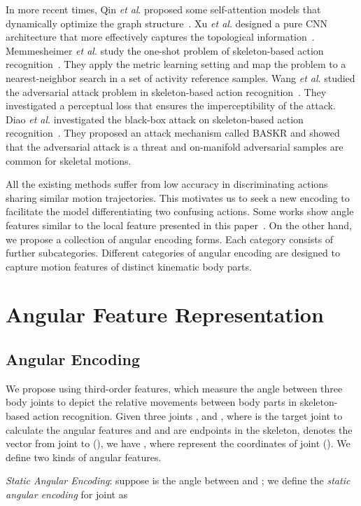 \documentclass[journal,comsoc]{IEEEtran}
\newcommand{\etal}{\textit{et al}. }
\begin{document}
In more recent times, Qin \etal proposed some self-attention models that dynamically optimize the graph structure~\cite{qin2022efficient}. Xu \etal designed a pure CNN architecture that more effectively captures the topological information~\cite{xu2022topology}. Memmesheimer \etal study the one-shot problem of skeleton-based action recognition~\cite{memmesheimer2022skeleton}. They apply the metric learning setting and map the problem to a nearest-neighbor search in a set of activity reference samples. Wang \etal studied the adversarial attack problem in skeleton-based action recognition~\cite{wang2021understanding}. They investigated a perceptual loss that ensures the imperceptibility of the attack. Diao \etal investigated the black-box attack on skeleton-based action recognition~\cite{diao2021basar}. They proposed an attack mechanism called BASKR and showed that the adversarial attack is a threat and on-manifold adversarial samples are common for skeletal motions. 

All the existing methods suffer from low accuracy in discriminating actions sharing similar motion trajectories. This motivates us to seek a new encoding to facilitate the model differentiating two confusing actions. Some works show angle features similar to the local feature presented in this paper~\cite{hu2022skeleton,yadav2022skeleton}. On the other hand, we propose a collection of angular encoding forms. Each category consists of further subcategories. Different categories of angular encoding are designed to capture motion features of distinct kinematic body parts. 


 \section{Angular Feature Representation}
\subsection{Angular Encoding}

We propose using third-order features, which measure the angle between three body joints to depict the relative movements between body parts in skeleton-based action recognition. Given three joints ,  and , where  is the target joint to calculate the angular features and  and  are endpoints in the skeleton, 
 denotes the vector from joint  to  (), we have , where  represent the coordinates of joint  (). We define two kinds of angular features. 

\textit{Static Angular Encoding}:
suppose  is the angle between  and ; we define the \emph{static angular encoding}  for joint  as 
\end{document}
